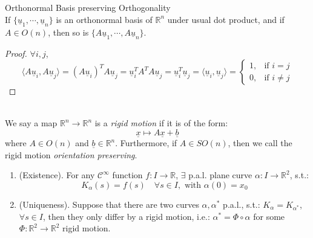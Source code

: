 \begin{proposition}{Orthonormal Basis preserving Orthogonality}\\
If $\{\underline{u}_1, \cdots, \underline{u}_n\}$ is an orthonormal basis of $\mathbb{R}^n$ under usual dot product, and if $A\in O(n)$, then so is $\{A\underline{u}_1, \cdots, A\underline{u}_n\}$.
\end{proposition}

\begin{proof}
$\forall i, j$,
\[
\langle A\underline{u}_i, A\underline{u}_j\rangle = (A\underline{u}_i)^T A\underline{u}_j = \underline{u}_i^T A^T A\underline{u}_j = \underline{u}_i^T\underline{u}_j = \langle\underline{u}_i, \underline{u}_j\rangle = \begin{cases}1, & \text{if } i = j\\ 0, & \text{if } i\neq j\end{cases}
\]
\end{proof}

\\
We say a map $\mathbb{R}^n\to\mathbb{R}^n$ is a \textit{rigid motion} if it is of the form:
\[
\underline{x}\mapsto A\underline{x} + \underline{b}
\]
where $A\in O(n)$ and $\underline{b}\in\mathbb{R}^n$. Furthermore, if $A\in SO(n)$, then we call the rigid motion \textit{orientation preserving}.

\begin{enumerate}
\item (Existence). For any $\mathcal{C}^\infty$ function $f: I\to\mathbb{R}$, $\exists$ p.a.l. plane curve $\alpha: I\to\mathbb{R}^2$, s.t.:
\[
K_\alpha(s) = f(s) \quad\forall s\in I, \text{ with } \alpha(0) = x_0
\]
\item (Uniqueness). Suppose that there are two curves $\alpha, \alpha^*$ p.a.l., s.t.: $K_\alpha = K_{\alpha^*}$, $\forall s\in I$, then they only differ by a rigid motion, i.e.: $\alpha^* = \Phi\circ\alpha$ for some $\Phi: \mathbb{R}^2\to\mathbb{R}^2$ rigid motion.
\end{enumerate}


